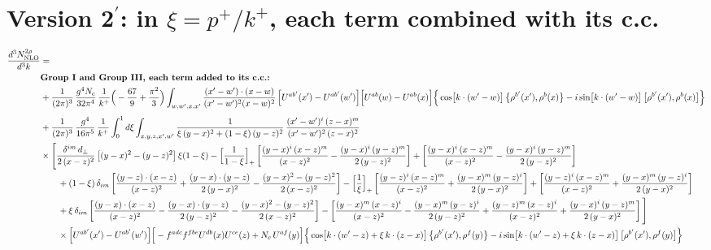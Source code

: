 \documentclass[10pt]{article}
\numberwithin{equation}{section}
\begin{document}
\section{Version 2$^{\prime}$: in $\xi=p^{+}/k^{+}$, each term combined with its c.c.}
\begin{align}
\frac{d^{3}N^{2\rho}_{\rm NLO}}{d^{3}k}&=\notag\\
&\textbf{Group I and Group III, each term added to its c.c.:}\notag\\
&+\frac{1}{(2\pi)^{3}}\,\frac{g^{4}N_{c}}{32\pi^{4}}\,\frac{1}{k^{+}}\Big(-\frac{67}{9}+\frac{\pi^{2}}{3}\Big)\int_{w,w^{\prime},x,x^{\prime}}\frac{(x^{\prime}-w^{\prime})\cdot(x-w)}{(x^{\prime}-w^{\prime})^{2}(x-w)^{2}}\,\Big[U^{ab^{\prime}}(x^{\prime})-U^{ab^{\prime}}(w^{\prime})\Big]\Big[U^{ab}(w)-U^{ab}(x)\Big]\Big\{\cos\!\big[k\cdot(w^{\prime}-w)\big]\,\big\{\rho^{b^{\prime}}(x^{\prime}),\rho^{b}(x)\big\}-i\sin\!\big[k\cdot(w^{\prime}-w)\big]\,\big[\rho^{b^{\prime}}(x^{\prime}),\rho^{b}(x)\big]\Big\}\notag\\[4pt]
&+\frac{1}{(2\pi)^{3}}\,\frac{g^{4}}{16\pi^{5}}\,\frac{1}{k^{+}}\int_{0}^{1}d\xi\int_{x,y,z,x^{\prime},w^{\prime}}\frac{1}{\xi\,(y-x)^{2}+(1-\xi)\,(y-z)^{2}}\,\frac{(x^{\prime}-w^{\prime})^{i}\,(z-x)^{m}}{(x^{\prime}-w^{\prime})^{2}\,(z-x)^{2}}\notag\\
&\times\Bigg[\frac{\delta^{im}\,d_{\perp}}{2\,(x-z)^{2}}\left[(y-x)^{2}-(y-z)^{2}\right]\xi(1-\xi)
-\Big[\frac{1}{1-\xi}\Big]_{+}\left[\frac{(y-x)^{i}\,(x-z)^{m}}{(x-z)^{2}}-\frac{(y-x)^{i}\,(y-z)^{m}}{2\,(y-z)^{2}}\right]
+\left[\frac{(y-x)^{i}\,(x-z)^{m}}{(x-z)^{2}}-\frac{(y-x)^{i}\,(y-z)^{m}}{2\,(y-z)^{2}}\right]\notag\\
&\qquad+(1-\xi)\,\delta_{im}\left[\frac{(y-z)\cdot(x-z)}{(x-z)^{2}}+\frac{(y-x)\cdot(y-z)}{2\,(y-x)^{2}}-\frac{(y-x)^{2}-(y-z)^{2}}{2\,(x-z)^{2}}\right]
-\Big[\frac{1}{\xi}\Big]_{+}\left[\frac{(y-z)^{i}\,(x-z)^{m}}{(x-z)^{2}}+\frac{(y-x)^{m}\,(y-z)^{i}}{2\,(y-x)^{2}}\right]+\left[\frac{(y-z)^{i}\,(x-z)^{m}}{(x-z)^{2}}+\frac{(y-x)^{m}\,(y-z)^{i}}{2\,(y-x)^{2}}\right]\notag\\
&\qquad+\xi\,\delta_{im}\left[\frac{(y-x)\cdot(x-z)}{(x-z)^{2}}-\frac{(y-x)\cdot(y-z)}{2\,(y-z)^{2}}-\frac{(y-x)^{2}-(y-z)^{2}}{2\,(x-z)^{2}}\right]
-\left[\frac{(y-x)^{m}\,(x-z)^{i}}{(x-z)^{2}}-\frac{(y-x)^{m}\,(y-z)^{i}}{2\,(y-z)^{2}}+\frac{(y-z)^{m}\,(x-z)^{i}}{(x-z)^{2}}+\frac{(y-x)^{i}\,(y-z)^{m}}{2\,(y-x)^{2}}\right]\Bigg]\notag\\
&\qquad\times\Big[U^{ab^{\prime}}(x^{\prime})-U^{ab^{\prime}}(w^{\prime})\Big]\Big[-f^{adc}f^{fbe}U^{db}(x)U^{ce}(z)+N_{c}\,U^{af}(y)\Big]\Big\{\cos\!\big[k\cdot(w^{\prime}-z)+\xi\,k\cdot(z-x)\big]\,\big\{\rho^{b^{\prime}}(x^{\prime}),\rho^{f}(y)\big\}-i\sin\!\big[k\cdot(w^{\prime}-z)+\xi\,k\cdot(z-x)\big]\,\big[\rho^{b^{\prime}}(x^{\prime}),\rho^{f}(y)\big]\Big\}\notag\\

\end{align}
\end{document}
